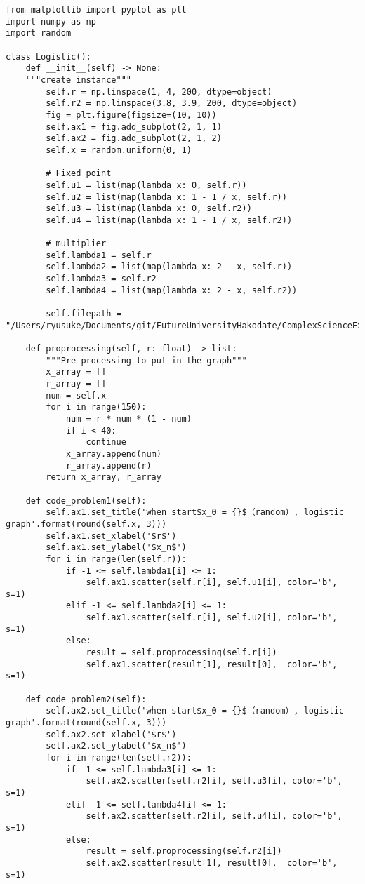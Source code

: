 \documentclass[dvipdfmx,uplatex]{jsarticle}
\begin{document}
\begin{lstlisting}[caption=Pythonによる課題１と課題２の描画]
from matplotlib import pyplot as plt
import numpy as np
import random

class Logistic():
    def __init__(self) -> None:
    """create instance"""
        self.r = np.linspace(1, 4, 200, dtype=object)
        self.r2 = np.linspace(3.8, 3.9, 200, dtype=object)
        fig = plt.figure(figsize=(10, 10))
        self.ax1 = fig.add_subplot(2, 1, 1)
        self.ax2 = fig.add_subplot(2, 1, 2)
        self.x = random.uniform(0, 1)

        # Fixed point
        self.u1 = list(map(lambda x: 0, self.r))
        self.u2 = list(map(lambda x: 1 - 1 / x, self.r))
        self.u3 = list(map(lambda x: 0, self.r2))
        self.u4 = list(map(lambda x: 1 - 1 / x, self.r2))

        # multiplier
        self.lambda1 = self.r
        self.lambda2 = list(map(lambda x: 2 - x, self.r))
        self.lambda3 = self.r2
        self.lambda4 = list(map(lambda x: 2 - x, self.r2))

        self.filepath = "/Users/ryusuke/Documents/git/FutureUniversityHakodate/ComplexScienceExercise/result/"

    def proprocessing(self, r: float) -> list:
        """Pre-processing to put in the graph"""
        x_array = []
        r_array = []
        num = self.x
        for i in range(150):
            num = r * num * (1 - num)
            if i < 40:
                continue
            x_array.append(num)
            r_array.append(r)
        return x_array, r_array

    def code_problem1(self):
        self.ax1.set_title('when start$x_0 = {}$（random）, logistic graph'.format(round(self.x, 3)))
        self.ax1.set_xlabel('$r$')
        self.ax1.set_ylabel('$x_n$')
        for i in range(len(self.r)):
            if -1 <= self.lambda1[i] <= 1:
                self.ax1.scatter(self.r[i], self.u1[i], color='b', s=1)
            elif -1 <= self.lambda2[i] <= 1:
                self.ax1.scatter(self.r[i], self.u2[i], color='b', s=1)
            else:
                result = self.proprocessing(self.r[i])
                self.ax1.scatter(result[1], result[0],  color='b', s=1)

    def code_problem2(self):
        self.ax2.set_title('when start$x_0 = {}$（random）, logistic graph'.format(round(self.x, 3)))
        self.ax2.set_xlabel('$r$')
        self.ax2.set_ylabel('$x_n$')
        for i in range(len(self.r2)):
            if -1 <= self.lambda3[i] <= 1:
                self.ax2.scatter(self.r2[i], self.u3[i], color='b', s=1)
            elif -1 <= self.lambda4[i] <= 1:
                self.ax2.scatter(self.r2[i], self.u4[i], color='b', s=1)
            else:
                result = self.proprocessing(self.r2[i])
                self.ax2.scatter(result[1], result[0],  color='b', s=1)


\end{lstlisting}
\end{document}
